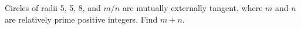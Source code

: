 Circles of radii 5, 5, 8, and $m/n$ are mutually externally tangent, where $m$ and $n$ are relatively prime positive integers.  Find $m+n.$